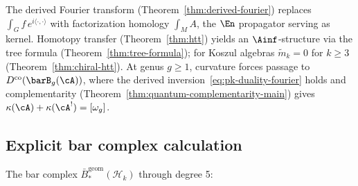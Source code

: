 \begin{remark}
\label{rem:fh-fourier}\label{rem:htt-fourier}\label{rem:curved-fourier}
The derived Fourier transform (Theorem~\ref{thm:derived-fourier}) replaces $\int_G f\, e^{i\langle\cdot,\cdot\rangle}$ with factorization homology $\int_M A$, the $\En$ propagator serving as kernel.  Homotopy transfer (Theorem~\ref{thm:htt}) yields an $\Ainf$-structure via the tree formula (Theorem~\ref{thm:tree-formula}); for Koszul algebras $\tilde{m}_k = 0$ for $k \geq 3$ (Theorem~\ref{thm:chiral-htt}).  At genus $g \geq 1$, curvature forces passage to $D^{\mathrm{co}}(\barB_g(\cA))$, where the derived inversion~\eqref{eq:pk-duality-fourier} holds and complementarity (Theorem~\ref{thm:quantum-complementarity-main}) gives $\kappa(\cA) + \kappa(\cA^!) = [\omega_g]$.
\end{remark}

\subsection{Explicit bar complex calculation}

The bar complex $\bar{B}^{\text{geom}}_*(\mathcal{H}_k)$ through degree 5:

